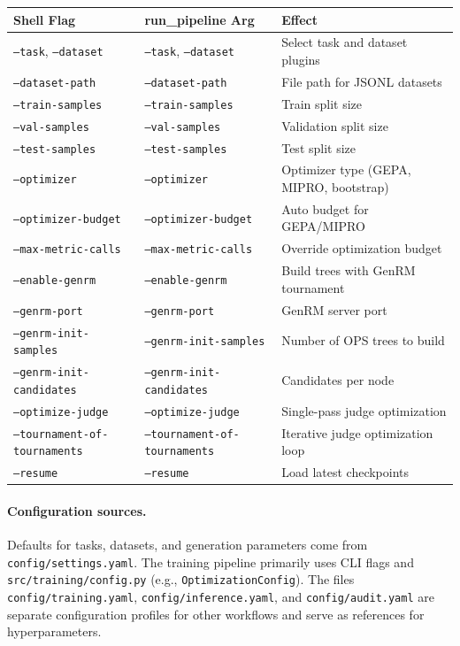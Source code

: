 \begin{center}
\begin{tabular}{lll}
\toprule
\textbf{Shell Flag} & \textbf{run\_pipeline Arg} & \textbf{Effect} \\
\midrule
\texttt{--task}, \texttt{--dataset} & \texttt{--task}, \texttt{--dataset} & Select task and dataset plugins \\
\texttt{--dataset-path} & \texttt{--dataset-path} & File path for JSONL datasets \\
\texttt{--train-samples} & \texttt{--train-samples} & Train split size \\
\texttt{--val-samples} & \texttt{--val-samples} & Validation split size \\
\texttt{--test-samples} & \texttt{--test-samples} & Test split size \\
\texttt{--optimizer} & \texttt{--optimizer} & Optimizer type (GEPA, MIPRO, bootstrap) \\
\texttt{--optimizer-budget} & \texttt{--optimizer-budget} & Auto budget for GEPA/MIPRO \\
\texttt{--max-metric-calls} & \texttt{--max-metric-calls} & Override optimization budget \\
\texttt{--enable-genrm} & \texttt{--enable-genrm} & Build trees with GenRM tournament \\
\texttt{--genrm-port} & \texttt{--genrm-port} & GenRM server port \\
\texttt{--genrm-init-samples} & \texttt{--genrm-init-samples} & Number of OPS trees to build \\
\texttt{--genrm-init-candidates} & \texttt{--genrm-init-candidates} & Candidates per node \\
\texttt{--optimize-judge} & \texttt{--optimize-judge} & Single-pass judge optimization \\
\texttt{--tournament-of-tournaments} & \texttt{--tournament-of-tournaments} & Iterative judge optimization loop \\
\texttt{--resume} & \texttt{--resume} & Load latest checkpoints \\
\bottomrule
\end{tabular}
\end{center}

\paragraph{Configuration sources.}
Defaults for tasks, datasets, and generation parameters come from
\texttt{config/settings.yaml}. The training pipeline primarily uses CLI flags and
\texttt{src/training/config.py} (e.g., \texttt{OptimizationConfig}). The files
\texttt{config/training.yaml}, \texttt{config/inference.yaml}, and
\texttt{config/audit.yaml} are separate configuration profiles for other
workflows and serve as references for hyperparameters.

